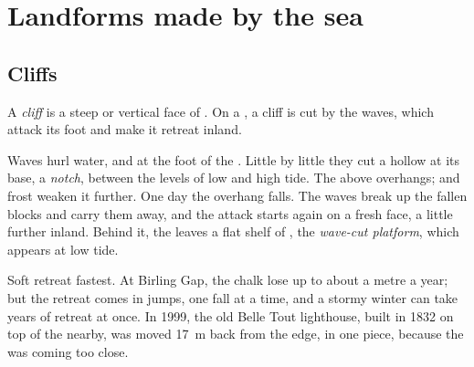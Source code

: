 \section{Landforms made by the sea}

\subsection{Cliffs}

\begin{definition}[Cliff]\label{def:g9:landforms:cliff}
A \emph{cliff} is a steep or vertical face of . On a
, a cliff is cut by the waves, which attack its foot and make it
retreat inland.
\end{definition}

Waves hurl water,  and  at the foot of the . Little by
little they cut a hollow at its base, a \emph{notch}, between the levels of
low and high tide. The  above overhangs;  and frost weaken it
further. One day the overhang falls. The waves break up the fallen blocks
and carry them away, and the attack starts again on a fresh face, a little
further inland. Behind it, the  leaves a flat shelf of , the
\emph{wave-cut platform}, which appears at low
tide.

Soft  retreat fastest. At Birling Gap, the chalk  lose up to
about a metre a year; but the retreat comes in jumps, one fall at a time,
and a stormy winter can take years of retreat at once. In 1999, the old
Belle Tout lighthouse, built in 1832 on top of the  nearby, was moved
\qty{17}{m} back from the edge, in one piece, because the  was coming
too close.

